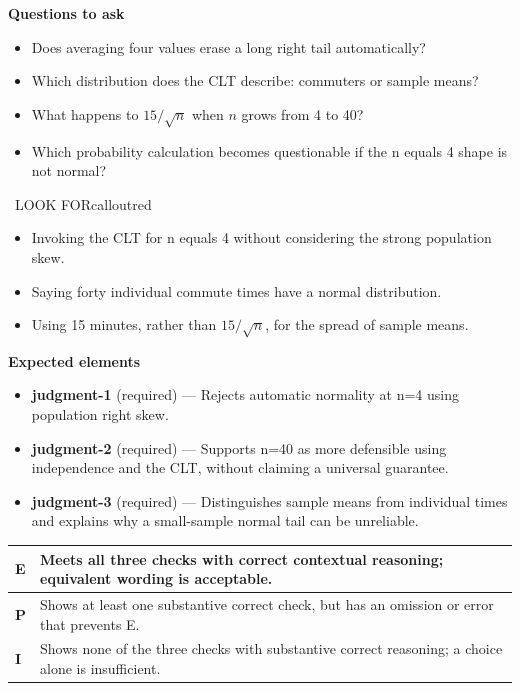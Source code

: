 \documentclass[11pt]{article}
\begin{document}
\textbf{Questions to ask}
\begin{itemize}[leftmargin=1.5em,itemsep=2pt,topsep=2pt]
  \item Does averaging four values erase a long right tail automatically?
  \item Which distribution does the CLT describe: commuters or sample means?
  \item What happens to $15/\sqrt{n}$ when $n$ grows from 4 to 40?
  \item Which probability calculation becomes questionable if the n equals 4 shape is not normal?
\end{itemize}

\begin{callout}{\IconWarn\ LOOK FOR}{calloutred}
\begin{itemize}[leftmargin=1.5em,itemsep=2pt,topsep=2pt]
  \item Invoking the CLT for n equals 4 without considering the strong population skew.
  \item Saying forty individual commute times have a normal distribution.
  \item Using 15 minutes, rather than $15/\sqrt{n}$, for the spread of sample means.
\end{itemize}
\end{callout}


\textbf{Expected elements}
\begin{itemize}[leftmargin=1.5em,itemsep=2pt,topsep=2pt]
  \item \textbf{judgment-1} (required) --- Rejects automatic normality at n=4 using population right skew.
  \item \textbf{judgment-2} (required) --- Supports n=40 as more defensible using independence and the CLT, without claiming a universal guarantee.
  \item \textbf{judgment-3} (required) --- Distinguishes sample means from individual times and explains why a small-sample normal tail can be unreliable.
\end{itemize}

{\small\renewcommand{\arraystretch}{1.25}
\noindent\begin{tabular}{|p{0.5in}|p{5.9in}|}
\hline
\textbf{E} & Meets all three checks with correct contextual reasoning; equivalent wording is acceptable. \\ \hline
\textbf{P} & Shows at least one substantive correct check, but has an omission or error that prevents E. \\ \hline
\textbf{I} & Shows none of the three checks with substantive correct reasoning; a choice alone is insufficient. \\ \hline
\end{tabular}}
\end{document}
